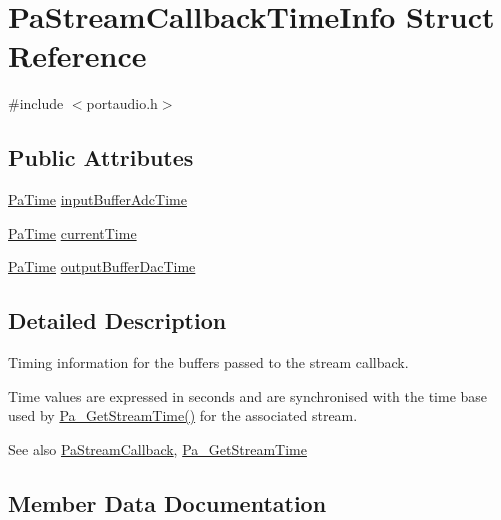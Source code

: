 \hypertarget{struct_pa_stream_callback_time_info}{}\section{Pa\+Stream\+Callback\+Time\+Info Struct Reference}
\label{struct_pa_stream_callback_time_info}


{\ttfamily \#include $<$portaudio.\+h$>$}

\subsection*{Public Attributes}
\begin{DoxyCompactItemize}
\item 
\hyperlink{portaudio_8h_af17a7e6d0471a23071acf8dbd7bbe4bd}{Pa\+Time} \hyperlink{struct_pa_stream_callback_time_info_ad114a6d5e1cf2cdd75837c33c1c8bb4c}{input\+Buffer\+Adc\+Time}
\item 
\hyperlink{portaudio_8h_af17a7e6d0471a23071acf8dbd7bbe4bd}{Pa\+Time} \hyperlink{struct_pa_stream_callback_time_info_af21eb5482cadb212dae38fdbbd9bebfb}{current\+Time}
\item 
\hyperlink{portaudio_8h_af17a7e6d0471a23071acf8dbd7bbe4bd}{Pa\+Time} \hyperlink{struct_pa_stream_callback_time_info_aa2052c42394fca748e83517fc8942609}{output\+Buffer\+Dac\+Time}
\end{DoxyCompactItemize}


\subsection{Detailed Description}
Timing information for the buffers passed to the stream callback.

Time values are expressed in seconds and are synchronised with the time base used by \hyperlink{portaudio_8h_a2b3fb60e6949f37f7f134105ff425749}{Pa\+\_\+\+Get\+Stream\+Time()} for the associated stream.

\begin{DoxySeeAlso}{See also}
\hyperlink{portaudio_8h_a8a60fb2a5ec9cbade3f54a9c978e2710}{Pa\+Stream\+Callback}, \hyperlink{portaudio_8h_a2b3fb60e6949f37f7f134105ff425749}{Pa\+\_\+\+Get\+Stream\+Time} 
\end{DoxySeeAlso}


\subsection{Member Data Documentation}
\mbox{\label{struct_pa_stream_callback_time_info_af21eb5482cadb212dae38fdbbd9bebfb}} 

